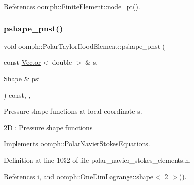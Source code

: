References oomph\+::\+Finite\+Element\+::node\+\_\+pt().

\mbox{\label{classoomph_1_1PolarTaylorHoodElement_a017ced81001a0b0cbeaf4701ef2d4792}} 
\subsubsection{\texorpdfstring{pshape\+\_\+pnst()}{pshape\_pnst()}\hspace{0.1cm}{\footnotesize\ttfamily [1/2]}}
{\footnotesize\ttfamily void oomph\+::\+Polar\+Taylor\+Hood\+Element\+::pshape\+\_\+pnst (\begin{DoxyParamCaption}\item[{const \hyperlink{classoomph_1_1Vector}{Vector}$<$ double $>$ \&}]{s,  }\item[{\hyperlink{classoomph_1_1Shape}{Shape} \&}]{psi }\end{DoxyParamCaption}) const\hspace{0.3cm}{\ttfamily [inline]}, {\ttfamily [protected]}, {\ttfamily [virtual]}}



Pressure shape functions at local coordinate s. 

2D \+: Pressure shape functions 

Implements \hyperlink{classoomph_1_1PolarNavierStokesEquations_a1b382bf38d7b7041417bbc91ad85b38f}{oomph\+::\+Polar\+Navier\+Stokes\+Equations}.



Definition at line 1052 of file polar\+\_\+navier\+\_\+stokes\+\_\+elements.\+h.



References i, and oomph\+::\+One\+Dim\+Lagrange\+::shape$<$ 2 $>$().

\mbox{\label{classoomph_1_1PolarTaylorHoodElement_ad382221466572628efe24ae3c0be7291}} 
